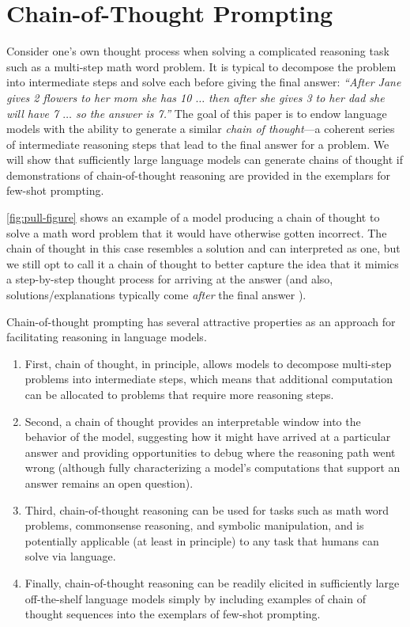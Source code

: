 \documentclass[]{article}
\theoremstyle{plain}
\theoremstyle{definition}
\theoremstyle{remark}
\begin{document}
\section{Chain-of-Thought Prompting}
Consider one's own thought process when solving a complicated reasoning task such as a multi-step math word problem. 
It is typical to decompose the problem into intermediate steps and solve each before giving the final answer: \textit{``After Jane gives 2 flowers to her mom she has 10 $\ldots$ then after she gives 3 to her dad she will have 7 $\ldots$ so the answer is 7.''}
The goal of this paper is to endow language models with the ability to generate a similar \textit{chain of thought}---a coherent series of intermediate reasoning steps that lead to the final answer for a problem.
We will show that sufficiently large language models can generate chains of thought if demonstrations of chain-of-thought reasoning are provided in the exemplars for few-shot prompting.

\cref{fig:pull-figure} shows an example of a model producing a chain of thought to solve a math word problem that it would have otherwise gotten incorrect.
The chain of thought in this case resembles a solution and can interpreted as one, but we still opt to call it a chain of thought to better capture the idea that it mimics a step-by-step thought process for arriving at the answer (and also, solutions/explanations typically come \textit{after} the final answer \citep[][\textit{inter alia}]{narang2020wt5,wiegreffe2021reframing,lampinen2022can}).

Chain-of-thought prompting has several attractive properties as an approach for facilitating reasoning in language models.
\begin{enumerate}[topsep=1pt,itemsep=0ex]%
    \item First, chain of thought, in principle, allows models to decompose multi-step problems into intermediate steps, which means that additional computation can be allocated to problems that require more reasoning steps.
    \item Second, a chain of thought provides an interpretable window into the behavior of the model, suggesting how it might have arrived at a particular answer and providing opportunities to debug where the reasoning path went wrong (although fully characterizing a model's computations that support an answer remains an open question).
    \item Third, chain-of-thought reasoning can be used for tasks such as math word problems, commonsense reasoning, and symbolic manipulation, and is potentially applicable (at least in principle) to any task that humans can solve via language.
    \item Finally, chain-of-thought reasoning can be readily elicited in sufficiently large off-the-shelf language models simply by including examples of chain of thought sequences into the exemplars of few-shot prompting.
\end{enumerate}
\end{document}
